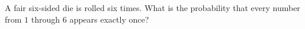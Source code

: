A fair six-sided die is rolled six times. What is the probability that every number from $1$ through $6$ appears exactly once?
